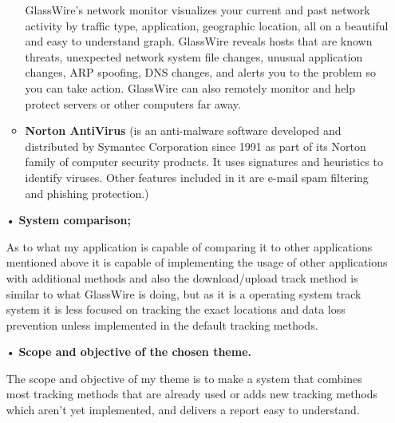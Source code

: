 \begin{itemize}
\begin{itemize}
GlassWire's network monitor visualizes your current and past network activity by traffic type, application, geographic location, all on a beautiful and easy to understand graph.
GlassWire reveals hosts that are known threats, unexpected network system file changes, unusual application changes, ARP spoofing, DNS changes, and alerts you to the problem so you can take action. GlassWire can also remotely monitor and help protect servers or other computers far away. 
\item \textbf{Norton AntiVirus} (is an anti-malware software developed and distributed by Symantec Corporation since 1991 as part of its Norton family of computer security products. It uses signatures and heuristics to identify viruses. Other features included in it are e-mail spam filtering and phishing protection.)
\end{itemize}
\item[•] \textbf{System comparison;} \par
As to what my application is capable of comparing it to other applications mentioned above it is capable of implementing the usage of other applications with additional methods and also the download/upload track method is similar to  what GlassWire is doing, but as it is a operating system track system it is less focused on tracking the exact locations and data loss prevention unless implemented in the default tracking methods.
\item[•] \textbf{Scope and objective of the chosen theme.} \par 
The scope and objective of my theme is to make a system that combines most tracking methods that are already used or adds new tracking methods which aren't yet implemented, and delivers a report easy to understand.
\end{itemize}
\clearpage
